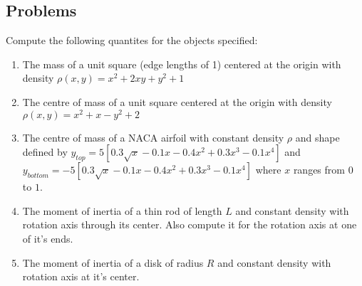 \documentclass[letterpaper,11pt]{article}
\begin{document}
\subsection*{Problems}
Compute the following quantites for the objects specified:
\begin{enumerate}
  \item The mass of a unit square (edge lengths of 1) centered at the origin with density $\rho(x, y) = x^2 + 2 x y + y^2 + 1$\\
    \newline
    \newline
    \newline
    \newline
  \item The centre of mass of a unit square centered at the origin with density $\rho(x, y) = x^2 + x - y^2 + 2$\\
    \newline
    \newline
    \newline
    \newline
  \item The centre of mass of a NACA airfoil with constant density $\rho$ and shape defined by
    $y_{top} = 5 [0.3 \sqrt{x} - 0.1 x - 0.4 x^2 + 0.3 x^3 - 0.1 x^4]$ and
    $y_{bottom} = -5 [0.3 \sqrt{x} - 0.1 x - 0.4 x^2 + 0.3 x^3 - 0.1 x^4]$ where $x$ ranges from $0$ to $1$.\\
    \newline
    \newline
    \newline
    \newline
  \item The moment of inertia of a thin rod of length $L$ and constant density with rotation axis through its center.
    Also compute it for the rotation axis at one of it's ends.\\
    \newline
    \newline
    \newline
    \newline
  \item The moment of inertia of a disk of radius $R$ and constant density with rotation axis at it's center.\\
    \newline
    \newline
    \newline
    \newline
\end{enumerate}
\end{document}
